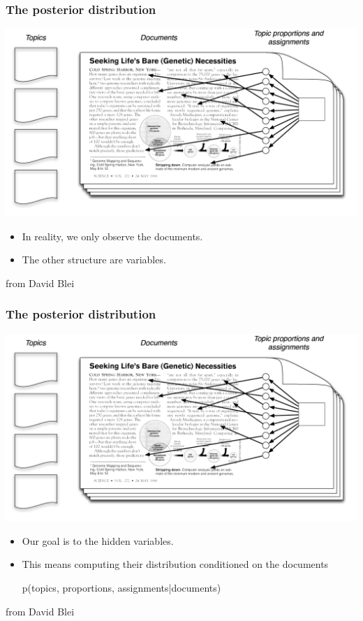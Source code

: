 \begin{frame}
\frametitle{The posterior distribution}

\centerline{\includegraphics[width=\textwidth]{LDA_toy_graph3}}
\begin{itemize}
\item In reality, we only observe the documents.
\item The other structure are  variables.
\end{itemize}
\hfill{\tiny from David Blei}
\end{frame}


\begin{frame}
\frametitle{The posterior distribution}

\centerline{\includegraphics[width=\textwidth]{LDA_toy_graph3}}
\begin{itemize}
\item Our goal is to  the hidden variables.
\item This means computing their distribution conditioned on the documents
\centerline{p(topics, proportions, assignments|documents)}
\end{itemize}
\hfill{\tiny from David Blei}

\end{frame}


